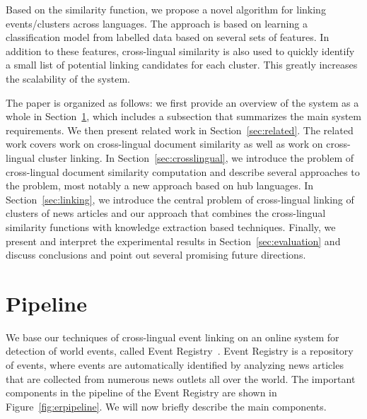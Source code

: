\documentclass[twoside,11pt]{article}
\begin{document}
Based on the similarity function, we propose a novel algorithm for linking events/clusters across languages. The approach is based on learning a classification model from labelled data based on several sets of features. In addition to these features, cross-lingual similarity is also used to quickly identify a small list of potential linking candidates for each cluster.
This greatly increases the scalability of the system.

The paper is organized as follows: we first provide an overview of the system as a whole in Section~\ref{sec:pipeline}, which includes a subsection that summarizes the main system requirements. We then present related work in Section~\ref{sec:related}. The related work covers work on cross-lingual document similarity as well as work on cross-lingual cluster linking. In Section~\ref{sec:crosslingual}, we introduce the problem of cross-lingual document similarity computation and describe several approaches to the problem, most notably a new approach based on hub languages.
 In Section~\ref{sec:linking}, we introduce the central problem of cross-lingual linking of clusters of news articles and our approach that combines the cross-lingual similarity functions with knowledge extraction based techniques. Finally, we present and interpret the experimental results in Section~\ref{sec:evaluation} and discuss conclusions and point out several promising future directions.


\section{Pipeline}\label{sec:pipeline}

We base our techniques of cross-lingual event linking on an online system for detection of world events, called Event Registry~. Event Registry is a repository of events, where events are automatically identified by analyzing news articles that are collected from numerous news outlets all over the world. The important components in the pipeline of the Event Registry are shown in Figure~\ref{fig:erpipeline}. We will now briefly describe the main components.
\end{document}
